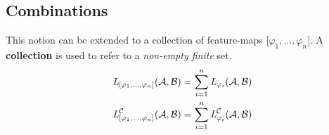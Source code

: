 \subsection{Combinations}
% 
This notion can be extended to a collection of feature-maps [$\varphi_1, \dots, \varphi_n$].
A \textbf{collection} is used to refer to a \textit{non-empty finite} set.
\begin{align*}
    \textit{L}_{[\varphi_1, \dots, \varphi_n]} (\mathcal A, \mathcal B) &= 
    \sum_{i=1}^n \textit{L}_{\varphi_i} (\mathcal A, \mathcal B) \\
    \textit{L}_{[\varphi_1, \dots, \varphi_n]}^{\mathcal C} (\mathcal A, \mathcal B) &= 
    \sum_{i=1}^n \textit{L}_{\varphi_i}^{\mathcal C} (\mathcal A, \mathcal B)
\end{align*}

